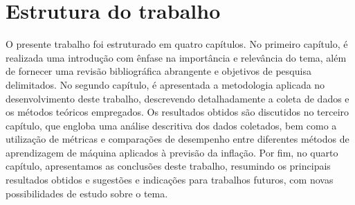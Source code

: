 \section{Estrutura do trabalho}\label{sec-estrutura}

O presente trabalho foi estruturado em quatro capítulos. No primeiro capítulo, é realizada uma introdução com ênfase na importância e relevância do tema, além de fornecer uma revisão bibliográfica abrangente e objetivos de pesquisa delimitados. No segundo capítulo, é apresentada a metodologia aplicada no desenvolvimento deste trabalho, descrevendo detalhadamente a coleta de dados e os métodos teóricos empregados. Os resultados obtidos são discutidos no terceiro capítulo, que engloba uma análise descritiva dos dados coletados, bem como a utilização de métricas e comparações de desempenho entre diferentes métodos de aprendizagem de máquina aplicados à previsão da inflação. Por fim, no quarto capítulo, apresentamos as conclusões deste trabalho, resumindo os principais resultados obtidos e sugestões e indicações para trabalhos futuros, com novas possibilidades de estudo sobre o tema.